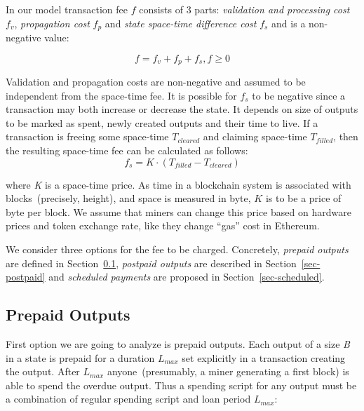 \documentclass[]{llncs}   %
\newcommand{\authnote}[2]{\marginpar{\parbox{\marginparwidth}{\tiny %
  \textsf{#1 {\textcolor{blue}{notes: #2}}}}}%
  \textcolor{blue}{\textbf{\dag}}}
\newcommand{\authnote}[2]{
  \textsf{#1 \textcolor{blue}{: #2}}}
\newcommand{\authnote}[2]{}
\newcommand{\knote}[1]{{\authnote{\textcolor{green}{Alex notes}}{#1}}}
\begin{document}
In our model transaction fee $f$ consists of 3 parts: \textit{validation and processing cost} $f_v$, \textit{propagation cost} $f_p$ and \textit{state space-time difference cost} $f_s$ and is a non-negative value:

\begin{equation}
f = f_v + f_p + f_s , f \ge 0
\end{equation}

Validation and propagation costs are non-negative and assumed to be independent from the space-time fee. It is possible for $f_s$ to be negative since a transaction may both increase or decrease the state. It depends on size of outputs to be marked as spent, newly created outputs and their time to live. If a transaction is freeing some space-time \textit{$T_{cleared}$} and claiming space-time \textit{$T_{filled}$}, then the  resulting space-time fee can be calculated as follows:
\begin{equation}
f_s = K \cdot (T_{filled} - T_{cleared})
\end{equation}

\knote{we need to say somehow here about prepaid and postpaid outputs defined below}

where \textit{K} is a space-time price. As time in a blockchain system is associated with blocks~(precisely, height), and space is measured in byte, $K$ is to be a price of byte per block. We assume that miners can change this price based on hardware prices and token exchange rate, like they change ``gas'' cost in Ethereum.

We consider three options for the fee to be charged. Concretely, \textit{prepaid outputs} are defined in Section~\ref{sec-prepaid}, \textit{postpaid outputs} are described in Section~\ref{sec-postpaid} and \textit{scheduled payments} are proposed in Section~\ref{sec-scheduled}.

\subsection{Prepaid Outputs}
\label{sec-prepaid}

First option we are going to analyze is prepaid outputs. Each output of a size \textit{B} in a state is prepaid for a duration $L_{max}$ set explicitly in a transaction creating the output. After $L_{max}$ anyone~(presumably, a miner generating a first block) is able to spend the overdue output. Thus a spending script for any output must be a combination of regular spending script and loan period $L_{max}$:
\end{document}
